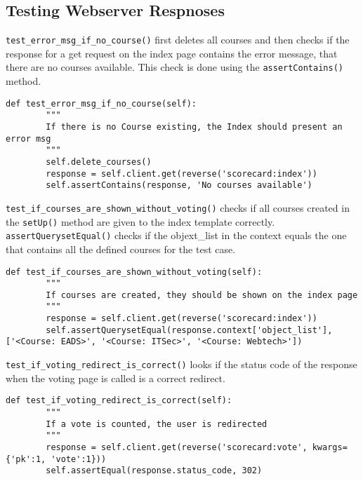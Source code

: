 \subsection{Testing Webserver Respnoses}
\lstinline|test_error_msg_if_no_course()| first deletes all courses and then checks if the response for a get request on the index page contains the error message, that there are no courses available. This check is done using the \lstinline|assertContains()| method.

\begin{lstlisting}[style=Python, caption=Exceprt from scorecard/tests.py, label=lst:tests.py]
    def test_error_msg_if_no_course(self):
        """
        If there is no Course existing, the Index should present an error msg
        """
        self.delete_courses()
        response = self.client.get(reverse('scorecard:index'))
        self.assertContains(response, 'No courses available')
\end{lstlisting}


\lstinline|test_if_courses_are_shown_without_voting()| checks if all courses created in the \lstinline|setUp()| method are given to the index template correctly. \lstinline|assertQuerysetEqual()| checks if the objext\_list in the context equals the one that contains all the defined courses for the test case.

\begin{lstlisting}[style=Python, caption=Exceprt from scorecard/tests.py, label=lst:tests.py]
    def test_if_courses_are_shown_without_voting(self):
        """
        If courses are created, they should be shown on the index page
        """
        response = self.client.get(reverse('scorecard:index'))
        self.assertQuerysetEqual(response.context['object_list'], ['<Course: EADS>', '<Course: ITSec>', '<Course: Webtech>'])
\end{lstlisting}

\lstinline|test_if_voting_redirect_is_correct()| looks if the status code of the response when the voting page is called is a correct redirect.

\begin{lstlisting}[style=Python, caption=Exceprt from scorecard/tests.py, label=lst:tests.py]
    def test_if_voting_redirect_is_correct(self):
        """
        If a vote is counted, the user is redirected
        """
        response = self.client.get(reverse('scorecard:vote', kwargs={'pk':1, 'vote':1}))
        self.assertEqual(response.status_code, 302)
\end{lstlisting}

